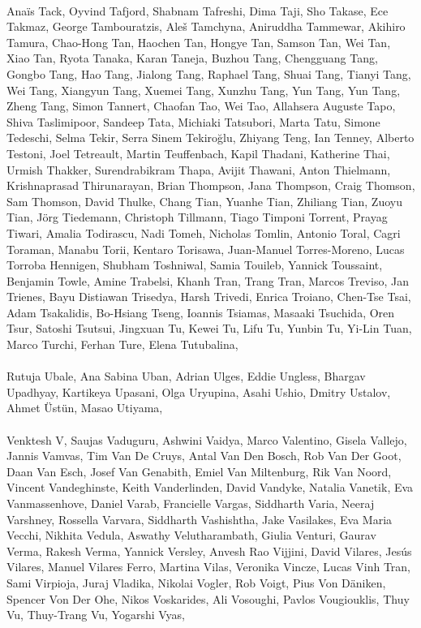 \paragraph{}Anaïs Tack, Oyvind Tafjord, Shabnam Tafreshi, Dima Taji, Sho Takase, Ece Takmaz, George Tambouratzis, Aleš Tamchyna, Aniruddha Tammewar, Akihiro Tamura, Chao-Hong Tan, Haochen Tan, Hongye Tan, Samson Tan, Wei Tan, Xiao Tan, Ryota Tanaka, Karan Taneja, Buzhou Tang, Chengguang Tang, Gongbo Tang, Hao Tang, Jialong Tang, Raphael Tang, Shuai Tang, Tianyi Tang, Wei Tang, Xiangyun Tang, Xuemei Tang, Xunzhu Tang, Yun Tang, Yun Tang, Zheng Tang, Simon Tannert, Chaofan Tao, Wei Tao, Allahsera Auguste Tapo, Shiva Taslimipoor, Sandeep Tata, Michiaki Tatsubori, Marta Tatu, Simone Tedeschi, Selma Tekir, Serra Sinem Tekiroğlu, Zhiyang Teng, Ian Tenney, Alberto Testoni, Joel Tetreault, Martin Teuffenbach, Kapil Thadani, Katherine Thai, Urmish Thakker, Surendrabikram Thapa, Avijit Thawani, Anton Thielmann, Krishnaprasad Thirunarayan, Brian Thompson, Jana Thompson, Craig Thomson, Sam Thomson, David Thulke, Chang Tian, Yuanhe Tian, Zhiliang Tian, Zuoyu Tian, Jörg Tiedemann, Christoph Tillmann, Tiago Timponi Torrent, Prayag Tiwari, Amalia Todirascu, Nadi Tomeh, Nicholas Tomlin, Antonio Toral, Cagri Toraman, Manabu Torii, Kentaro Torisawa, Juan-Manuel Torres-Moreno, Lucas Torroba Hennigen, Shubham Toshniwal, Samia Touileb, Yannick Toussaint, Benjamin Towle, Amine Trabelsi, Khanh Tran, Trang Tran, Marcos Treviso, Jan Trienes, Bayu Distiawan Trisedya, Harsh Trivedi, Enrica Troiano, Chen-Tse Tsai, Adam Tsakalidis, Bo-Hsiang Tseng, Ioannis Tsiamas, Masaaki Tsuchida, Oren Tsur, Satoshi Tsutsui, Jingxuan Tu, Kewei Tu, Lifu Tu, Yunbin Tu, Yi-Lin Tuan, Marco Turchi, Ferhan Ture, Elena Tutubalina,
\paragraph{}Rutuja Ubale, Ana Sabina Uban, Adrian Ulges, Eddie Ungless, Bhargav Upadhyay, Kartikeya Upasani, Olga Uryupina, Asahi Ushio, Dmitry Ustalov, Ahmet Üstün, Masao Utiyama,
\paragraph{}Venktesh V, Saujas Vaduguru, Ashwini Vaidya, Marco Valentino, Gisela Vallejo, Jannis Vamvas, Tim Van De Cruys, Antal Van Den Bosch, Rob Van Der Goot, Daan Van Esch, Josef Van Genabith, Emiel Van Miltenburg, Rik Van Noord, Vincent Vandeghinste, Keith Vanderlinden, David Vandyke, Natalia Vanetik, Eva Vanmassenhove, Daniel Varab, Francielle Vargas, Siddharth Varia, Neeraj Varshney, Rossella Varvara, Siddharth Vashishtha, Jake Vasilakes, Eva Maria Vecchi, Nikhita Vedula, Aswathy Velutharambath, Giulia Venturi, Gaurav Verma, Rakesh Verma, Yannick Versley, Anvesh Rao Vijjini, David Vilares, Jesús Vilares, Manuel Vilares Ferro, Martina Vilas, Veronika Vincze, Lucas Vinh Tran, Sami Virpioja, Juraj Vladika, Nikolai Vogler, Rob Voigt, Pius Von Däniken, Spencer Von Der Ohe, Nikos Voskarides, Ali Vosoughi, Pavlos Vougiouklis, Thuy Vu, Thuy-Trang Vu, Yogarshi Vyas,
